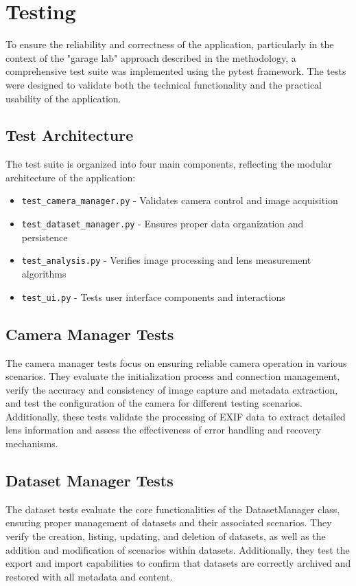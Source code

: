 \section{Testing}

To ensure the reliability and correctness of the application, particularly in the context of the "garage lab" approach described in the methodology, a comprehensive test suite was implemented using the pytest framework. The tests were designed to validate both the technical functionality and the practical usability of the application.

\subsection{Test Architecture}
The test suite is organized into four main components, reflecting the modular architecture of the application:
\begin{itemize}
    \item \texttt{test\_camera\_manager.py} - Validates camera control and image acquisition
    \item \texttt{test\_dataset\_manager.py} - Ensures proper data organization and persistence
    \item \texttt{test\_analysis.py} - Verifies image processing and lens measurement algorithms
    \item \texttt{test\_ui.py} - Tests user interface components and interactions
\end{itemize}

\subsection{Camera Manager Tests}
The camera manager tests focus on ensuring reliable camera operation in various scenarios. They evaluate the initialization process and connection management, verify the accuracy and consistency of image capture and metadata extraction, and test the configuration of the camera for different testing scenarios. Additionally, these tests validate the processing of EXIF data to extract detailed lens information and assess the effectiveness of error handling and recovery mechanisms.

\subsection{Dataset Manager Tests}

The dataset tests evaluate the core functionalities of the DatasetManager class, ensuring proper management of datasets and their associated scenarios. They verify the creation, listing, updating, and deletion of datasets, as well as the addition and modification of scenarios within datasets. Additionally, they test the export and import capabilities to confirm that datasets are correctly archived and restored with all metadata and content.

